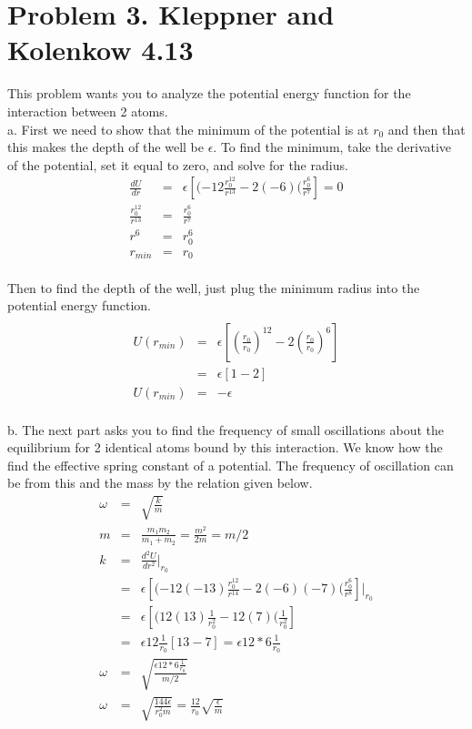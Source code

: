 \documentclass[11pt]{amsart}
\begin{document}
\section{Problem 3. Kleppner and Kolenkow 4.13}
This problem wants you to analyze the potential energy function for the interaction between 2 atoms. \\
a. First we need to show that the minimum of the potential is at $r_{0}$ and then that this makes the depth of the well be $\epsilon$. To find the minimum, take the derivative of the potential, set it equal to zero, and solve for the radius. \\ 
\begin{eqnarray*}
\frac{dU}{dr} &=& \epsilon[(-12\frac{r_{0}^{12}}{r^{13}}-2(-6)(\frac{r_{0}^{6}}{r^{7}}] = 0 \\
\frac{r_{0}^{12}}{r^{13} }&=& \frac{r_{0}^{6}}{r^{7}} \\
r^{6} &=&r_{0}^{6} \\
r_{min} &=& r_{0} 
\end{eqnarray*} \\
Then to find the depth of the well, just plug the minimum radius into the potential energy function. \\ 
\begin{eqnarray*} \\
U(r_{min}) &=& \epsilon[(\frac{r_{0}}{r_{0}})^{12}-2(\frac{r_{0}}{r_{0}})^{6}] \\
&=& \epsilon[1-2] \\
U(r_{min}) &=& -\epsilon 
\end{eqnarray*} \\
b. The next part asks you to find the frequency of small oscillations about the equilibrium for 2 identical atoms bound by this interaction. We know how the find the effective spring constant of a potential. The frequency of oscillation can be from this and the mass by the relation given below. \\ 
\begin{eqnarray*} 
\omega &=& \sqrt{\frac{k}{m}} \\
m &=& \frac{m_{1}m_{2}}{m_{1}+m_{2}} = \frac{m^{2}}{2m} = m/2\\
k &=& \frac{d^{2}U}{dr^{2}}|_{r_{0}} \\
&=& \epsilon[(-12(-13)\frac{r_{0}^{12}}{r^{14}}-2(-6)(-7)(\frac{r_{0}^{6}}{r^{8}}]|_{r_{0}} \\
&=&  \epsilon[(12(13)\frac{1}{r_{0}^{2}}-12(7)(\frac{1}{r_{0}^{2}}] \\
&=& \epsilon{12}\frac{1}{r_{0}}[13-7] = \epsilon{12*6}\frac{1}{r_{0}} \\
\omega &=&\sqrt{\frac{\epsilon12*6\frac{1}{r_{0}}}{m/2}} \\
\omega &=& \sqrt{\frac{144\epsilon}{r_{0}^{2}m}}  = \frac{12}{r_{0}}\sqrt{\frac{\epsilon}{m}} 
\end{eqnarray*} \\
\end{document}
